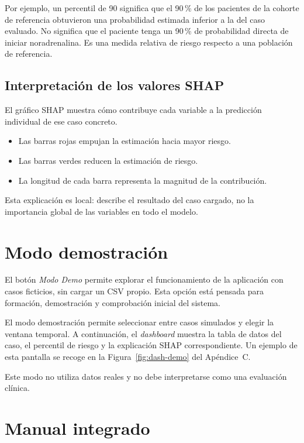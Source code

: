 \documentclass[
  spanish,
  a4paper,
  12pt,
  twoside]{memoir}
\begin{document}
Por ejemplo, un percentil de 90 significa que el 90\,\% de los pacientes de la cohorte de referencia obtuvieron una probabilidad estimada inferior a la del caso evaluado. No significa que el paciente tenga un 90\,\% de probabilidad directa de iniciar noradrenalina. Es una medida relativa de riesgo respecto a una población de referencia.

\subsection*{Interpretación de los valores SHAP}

El gráfico SHAP muestra cómo contribuye cada variable a la predicción individual de ese caso concreto.

\begin{itemize}
  \item Las barras rojas empujan la estimación hacia mayor riesgo.
  \item Las barras verdes reducen la estimación de riesgo.
  \item La longitud de cada barra representa la magnitud de la contribución.
\end{itemize}

Esta explicación es local: describe el resultado del caso cargado, no la importancia global de las variables en todo el modelo.

\section{Modo demostración}

El botón \emph{Modo Demo} permite explorar el funcionamiento de la aplicación con casos ficticios, sin cargar un CSV propio. Esta opción está pensada para formación, demostración y comprobación inicial del sistema.

El modo demostración permite seleccionar entre casos simulados y elegir la ventana temporal. A continuación, el \textit{dashboard} muestra la tabla de datos del caso, el percentil de riesgo y la explicación SHAP correspondiente. Un ejemplo de esta pantalla se recoge en la Figura~\ref{fig:dash-demo} del Apéndice~C.

Este modo no utiliza datos reales y no debe interpretarse como una evaluación clínica.

\section{Manual integrado}
\end{document}

